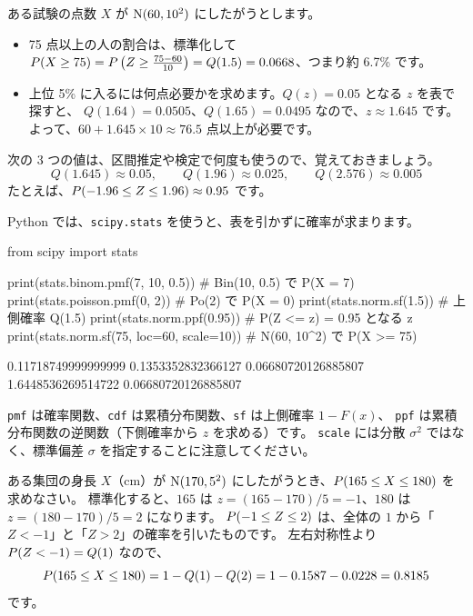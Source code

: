 \begin{example}
  ある試験の点数 $X$ が $\mathrm{N}(60, 10^2)$ にしたがうとします。
  \begin{itemize}
    \item 75 点以上の人の割合は、標準化して
      $P(X \ge 75) = P\left(Z \ge \frac{75 - 60}{10}\right) = Q(1.5) = 0.0668$、つまり約 6.7\% です。
    \item 上位 5\% に入るには何点必要かを求めます。$Q(z) = 0.05$ となる $z$ を表で探すと、
      $Q(1.64) = 0.0505$、$Q(1.65) = 0.0495$ なので、$z \approx 1.645$ です。
      よって、$60 + 1.645 \times 10 \approx 76.5$ 点以上が必要です。
  \end{itemize}
\end{example}

\begin{exampoint}
  次の 3 つの値は、区間推定や検定で何度も使うので、覚えておきましょう。
  \[
    Q(1.645) \approx 0.05, \qquad Q(1.96) \approx 0.025, \qquad Q(2.576) \approx 0.005
  \]
  たとえば、$P(-1.96 \le Z \le 1.96) \approx 0.95$ です。
\end{exampoint}

Python では、\texttt{scipy.stats} を使うと、表を引かずに確率が求まります。

\begin{pycode}[分布の確率を求める]
from scipy import stats

print(stats.binom.pmf(7, 10, 0.5))      # Bin(10, 0.5) で P(X = 7)
print(stats.poisson.pmf(0, 2))          # Po(2) で P(X = 0)
print(stats.norm.sf(1.5))               # 上側確率 Q(1.5)
print(stats.norm.ppf(0.95))             # P(Z <= z) = 0.95 となる z
print(stats.norm.sf(75, loc=60, scale=10))  # N(60, 10^2) で P(X >= 75)
\end{pycode}

\begin{pyoutput}
0.11718749999999999
0.1353352832366127
0.06680720126885807
1.6448536269514722
0.06680720126885807
\end{pyoutput}

\texttt{pmf} は確率関数、\texttt{cdf} は累積分布関数、\texttt{sf} は上側確率 $1 - F(x)$、
\texttt{ppf} は累積分布関数の逆関数（下側確率から $z$ を求める）です。
\texttt{scale} には分散 $\sigma^2$ ではなく、標準偏差 $\sigma$ を指定することに注意してください。

\begin{problem}
  ある集団の身長 $X$（cm）が $\mathrm{N}(170, 5^2)$ にしたがうとき、$P(165 \le X \le 180)$ を求めなさい。
  \tcblower
  標準化すると、$165$ は $z = (165 - 170)/5 = -1$、$180$ は $z = (180 - 170)/5 = 2$ になります。
  $P(-1 \le Z \le 2)$ は、全体の $1$ から「$Z < -1$」と「$Z > 2$」の確率を引いたものです。
  左右対称性より $P(Z < -1) = Q(1)$ なので、
  \[
    P(165 \le X \le 180) = 1 - Q(1) - Q(2) = 1 - 0.1587 - 0.0228 = 0.8185
  \]
  です。
\end{problem}

